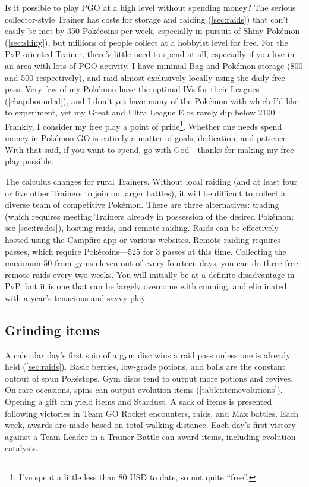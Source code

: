Is it possible to play PGO at a high level without spending money?
The serious collector-style Trainer has costs for storage and raiding (\autoref{sec:raids})
  that can't easily be met by 350 Pokécoins per week, especially
  in pursuit of Shiny Pokémon (\autoref{sec:shiny}),
  but millions of people collect at a hobbyist level for free.
For the PvP-oriented Trainer, there's little need to spend at all,
  especially if you live in an area with lots of PGO activity.
I have minimal Bag and Pokémon storage (800 and 500 respectively), and raid almost exclusively locally using the daily free pass.
Very few of my Pokémon have the optimal IVs for their Leagues (\autoref{chap:bounded}),
  and I don't yet have many of the Pokémon with which I'd like to experiment,
  yet my Great and Ultra League Elos rarely dip below 2100.
Frankly, I consider my free play a point of pride\footnote{I've spent a little less than 80 USD to date, so not quite ``free''.}.
Whether one needs spend money in Pokémon GO is entirely a matter of goals, dedication, and patience.
With that said, if you want to spend, go with God---thanks for making my free play possible.

The calculus changes for rural Trainers.
Without local raiding (and at least four or five other Trainers to join on larger battles),
  it will be difficult to collect a diverse team of competitive Pokémon.
There are three alternatives: trading (which requires meeting Trainers already in possession of the desired Pokémon;
  see \autoref{sec:trades}), hosting raids, and remote raiding.
Raids can be effectively hosted using the Campfire app or various websites.
Remote raiding requires passes, which require Pokécoins---525 for 3 passes at this time.
Collecting the maximum 50 from gyms eleven out of every fourteen days, you can do
  three free remote raids every two weeks.
You will initially be at a definite disadvantage in PvP, but it is one that can
  be largely overcome with cunning, and eliminated with a year's tenacious
  and savvy play.

\subsection{Grinding items\label{subsec:grinditems}}
A calendar day's first spin of a gym disc wins a raid pass unless one is already held (\autoref{sec:raids}).
Basic berries, low-grade potions, and balls are the constant output of spun Pokéstops.
Gym discs tend to output more potions and revives.
On rare occasions, spins can output evolution items (\autoref{table:itemevolutions}).
Opening a gift can yield items and Stardust.
A sack of items is presented following victories in Team GO Rocket encounters, raids, and Max battles.
Each week, awards are made based on total walking distance.
Each day's first victory against a Team Leader in a Trainer Battle can award items,
  including evolution catalysts.

